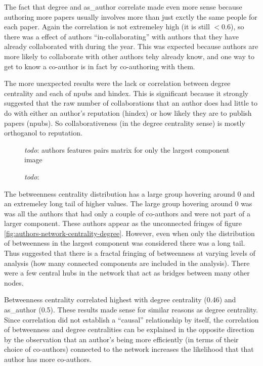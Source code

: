 \documentclass{article}
\newcommand{\todoblock}[1]{\noindent\textit{todo}: #1}
\newcommand{\todo}[1]{\textit{todo}: #1}
\begin{document}
The fact that degree and as\_author correlate made even more sense because authoring more papers usually involves more than just exctly the same people for each paper.
Again the correlation is not extremeley high (it is still $< 0.6$), so there was a effect of authors ``in-collaborating'' with authors that they have already collaborated with during the year.
This was expected because authors are more likely to collaborate with other authors tehy already know, and one way to get to know a co-author is in fact by co-authoring with them.

The more unexpected results were the lack or correlation between degree centrality and each of npubs and hindex.
This is significant because it strongly suggested that the raw number of collaborations that an author does had little to do with either an author's reputation (hindex) or how likely they are to publish papers (npubs).
So collaborativeness (in the degree centrality sense) is mostly orthoganol to reputation.

\begin{figure}[h!]
  \centering
  \todoblock{authors features pairs matrix for only the largest component image}
  \caption{\todo{}}
  \label{fig:authors-feature-pairs-matrix-cc}
\end{figure}

The betweenness centrality distribution has a large group hovering around 0 and an extremeley long tail of higher values.
The large group hovering around 0 was was all the authors that had only a couple of co-authors and were not part of a larger component.
These authors appear as the unconnected fringes of figure \ref{fig:authors-network-centrality-degree}.
However, even when only the distribution of betweenness in the largest component was considered there was a long tail.
Thus suggested that there is a fractal fringing of betweenness at varying levels of analysis (how many connected components are included in the analysis).
There were a few central hubs in the network that act as bridges between many other nodes.

Betweenness centrality correlated highest with degree centrality (0.46) and as\_author (0.5).
These results made sense for similar reasons as degree centrality.
Since correlation did not establish a ``causal'' relationship by itself, the correlation of betweenness and degree centralities can be explained in the opposite direction by the observation that an author's being more efficiently (in terms of their choice of co-authors) connected to the network increases the likelihood that that author has more co-authors.
\end{document}
